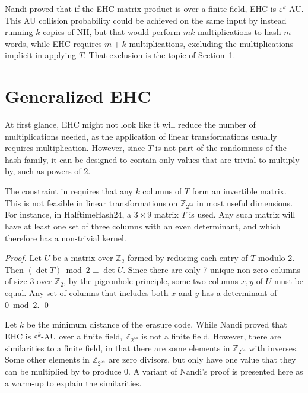 \documentclass[runningheads]{llncs}
\newcommand{\ints}{\mathbb{Z}}
\begin{document}
Nandi proved that if the EHC matrix product is over a finite field, EHC is $\varepsilon^k$-AU.
This AU collision probability could be achieved on the same input by instead running $k$ copies of NH, but that would perform $m k$ multiplications to hash $m$ words, while EHC requires $m + k$ multiplications, excluding the multiplications implicit in applying $T$.
That exclusion is the topic of Section~\ref{gehc}.

\section{Generalized EHC}
\label{gehc}

At first glance, EHC might not look like it will reduce the number of multiplications needed, as the application of linear transformations usually requires multiplication.
However, since $T$ is not part of the randomness of the hash family, it can be designed to contain only values that are trivial to multiply by, such as powers of $2$.

The constraint in \cite{ehc-nandi} requires that any $k$ columns of $T$ form an invertible matrix.
This is not feasible in linear transformations on $\ints_{2^{64}}$ in most useful dimensions.
For instance, in HalftimeHash24, a $3 \times 9$ matrix $T$ is used.
Any such matrix will have at least one set of three columns with an even determinant, and which therefore has a non-trivial kernel.

\begin{proof}
  Let $U$ be a matrix over $\ints_2$ formed by reducing each entry of $T$ modulo $2$.
  Then $(\det T) \bmod 2 \equiv \det U$.
  Since there are only 7 unique non-zero columns of size 3 over $\ints_2$, by the pigeonhole principle, some two columns $x, y$ of $U$ must be equal.
  Any set of columns that includes both $x$ and $y$ has a determinant of $0 \bmod 2$.
  \qed
\end{proof}


Let $k$ be the minimum distance of the erasure code.
While Nandi proved that EHC is $\varepsilon^k$-AU over a finite field, $\ints_{2^{64}}$ is not a finite field.
However, there are similarities to a finite field, in that there are some elements in $\ints_{2^{64}}$ with inverses.
Some other elements in $\ints_{2^{64}}$ are zero divisors, but only have one value that they can be multiplied by to produce 0.
A variant of Nandi's proof is presented here as a warm-up to explain the similarities. \cite{ehc-nandi}
\end{document}
